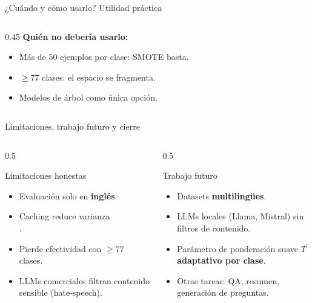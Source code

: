 \begin{frame}{¿Cuándo y cómo usarlo? Utilidad práctica}
\begin{columns}[T]
\begin{column}{0.45\textwidth}
\vspace{0.4em}
\small
\textbf{Quién no debería usarlo:}
\begin{itemize}\setlength\itemsep{1pt}
  \item Más de 50 ejemplos por clase: SMOTE basta.
  \item $\geq 77$ clases: el espacio se fragmenta.
  \item Modelos de árbol como única opción.
\end{itemize}
\end{column}

\end{columns}
\end{frame}

\begin{frame}{Limitaciones, trabajo futuro y cierre}
\small
\begin{columns}[T]

\begin{column}{0.5\textwidth}
\begin{block}{Limitaciones honestas}
\scriptsize
\begin{itemize}\setlength\itemsep{0pt}
  \item Evaluación solo en \textbf{inglés}.
  \item Caching reduce varianza\\.
  \item Pierde efectividad con $\geq 77$ clases.
  \item LLMs comerciales filtran contenido sensible (hate-speech).
\end{itemize}
\end{block}
\end{column}

\begin{column}{0.5\textwidth}
\begin{block}{Trabajo futuro}
\scriptsize
\begin{itemize}\setlength\itemsep{0pt}
  \item Datasets \textbf{multilingües}.
  \item LLMs locales (Llama, Mistral) sin filtros de contenido.
  \item Parámetro de ponderación suave $T$ \textbf{adaptativo por clase}.
  \item Otras tareas: QA, resumen, generación de preguntas.
\end{itemize}
\end{block}
\end{column}


\end{columns}
\end{frame}
